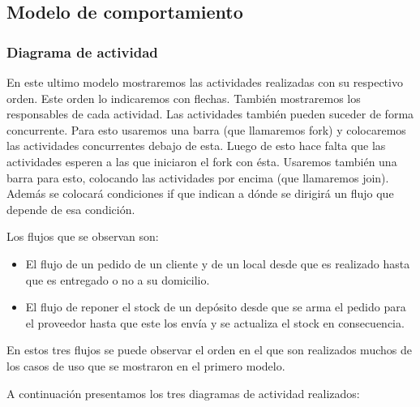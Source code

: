 \subsection{Modelo de comportamiento}

\subsubsection{Diagrama de actividad}

En este ultimo modelo mostraremos las actividades realizadas con su respectivo orden. Este orden lo indicaremos con flechas. También mostraremos los responsables de cada actividad. Las actividades también pueden suceder de forma concurrente. Para esto usaremos una barra (que llamaremos fork) y colocaremos las actividades concurrentes debajo de esta. Luego de esto hace falta que las actividades esperen a las que iniciaron el fork con ésta. Usaremos también una barra para esto, colocando las actividades por encima (que llamaremos join). Además se colocará condiciones if que indican a dónde se dirigirá un flujo que depende de esa condición.

Los flujos que se observan son:
\begin{itemize}
\item El flujo de un pedido de un cliente y de un local desde que es realizado hasta que es entregado o no a su domicilio.
\item El flujo de reponer el stock de un depósito desde que se arma el pedido para el proveedor hasta que este los envía y se actualiza el stock en consecuencia.
\end{itemize}

En estos tres flujos se puede observar el orden en el que son realizados muchos de los casos de uso que se mostraron en el primero modelo.

A continuación presentamos los tres diagramas de actividad realizados:

